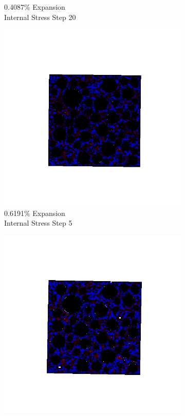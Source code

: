 \begin{figure}[ht!]
\begin{subfigure}{.25\textwidth}
      \caption{0.4087\% Expansion\\Internal Stress Step 20}
    \end{subfigure}
    \begin{subfigure}{.25\textwidth}
      \centering
      \includegraphics[width=1.0\linewidth]{Files/exp_3D/DEF/A30X-1C_3_s5.png}
      \caption{0.6191\% Expansion\\Internal Stress Step 5}
    \end{subfigure}%
    \begin{subfigure}{.25\textwidth}
      \centering
      \includegraphics[width=1.0\linewidth]{Files/exp_3D/DEF/A30X-1C_3_s10.png}

\end{subfigure}
\end{figure}
